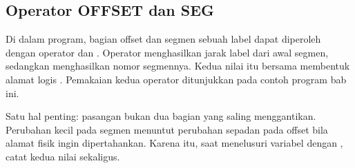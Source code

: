 \subsection{Operator OFFSET dan SEG}

Di dalam program, bagian offset dan segmen sebuah label dapat
diperoleh dengan operator  dan . Operator
 menghasilkan jarak label dari awal segmen, sedangkan
 menghasilkan nomor segmennya. Kedua nilai itu bersama
membentuk alamat logis . Pemakaian kedua
operator ditunjukkan pada contoh program bab ini.

Satu hal penting: pasangan  bukan dua bagian
yang saling menggantikan. Perubahan kecil pada segmen menuntut
perubahan sepadan pada offset bila alamat fisik ingin
dipertahankan. Karena itu, saat menelusuri variabel dengan
, catat kedua nilai sekaligus.
